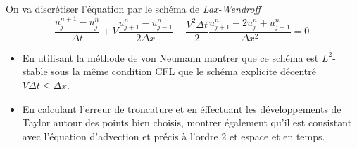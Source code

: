 \documentclass[12pt,a4paper]{article}
\begin{document}

\noindent On va discrétiser l'équation par le schéma de {\it Lax-Wendroff} 
$$
\frac{u_j^{n+1}-u_{j}^{n}}{\Delta t}+V
\frac{u_{j+1}^{n}-u_{j-1}^{n}}{2\Delta x}-\frac{V^2\Delta t}{2}\frac{u_{j+1}^{n}-2u_j^n+u_{j-1}^{n}}{\Delta x^2}=0.
$$
\begin{itemize}
\item[a)]
En utilisant la méthode de von Neumann montrer que ce sch\'ema est $L^2$-stable sous la même condition CFL que le schéma explicite décentré $V\Delta t \le \Delta x$. \\ %

\item[b)] En calculant l'erreur de troncature et en éffectuant les développements de Taylor autour des points bien choisis, montrer \'egalement qu'il est consistant avec l'\'equation d'advection et pr\'ecis \`a l'ordre $2$ et espace et en temps. 

\end{itemize}
\end{document}
